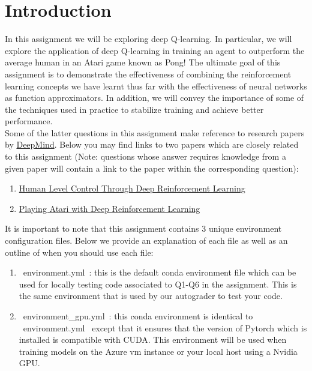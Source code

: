 \section{Introduction}\label{intro}

In this assignment we will be exploring deep Q-learning. In particular, we will explore the application of deep Q-learning in training an agent to outperform the average human in an Atari game known as Pong! The ultimate goal of this assignment is to demonstrate the effectiveness of combining the reinforcement learning concepts we have learnt thus far with the effectiveness of neural networks as function approximators. In addition, we will convey the importance of some of the techniques used in practice to stabilize training and achieve better performance. \\

Some of the latter questions in this assignment make reference to research papers by \href{https://deepmind.com/}{DeepMind}. Below you may find links to two papers which are closely related to this assignment (Note: questions whose answer requires knowledge from a given paper will contain a link to  the paper within the corresponding question):
\begin{enumerate}
  \item \href{https://storage.googleapis.com/deepmind-media/dqn/DQNNaturePaper.pdf}{Human Level Control Through Deep Reinforcement Learning}
  \item \href{https://arxiv.org/pdf/1312.5602v1.pdf}{Playing Atari with Deep Reinforcement Learning}
\end{enumerate}

  It is important to note that this assignment contains 3 unique environment configuration files. Below we provide an explanation of each file as well as an outline of when you should use each file:

  \begin{enumerate}
    \item ~environment.yml~: this is the default conda environment file which can be used for locally testing code associated to Q1-Q6 in the assignment. This is the same environment that is used by our autograder to test your code.

    \item ~environment_gpu.yml~: this conda environment is identical to ~environment.yml~ except that it ensures that the version of Pytorch which is installed is compatible with CUDA. This environment will be used when training models on the Azure vm instance or your local host using a Nvidia GPU.
  \end{enumerate} 




